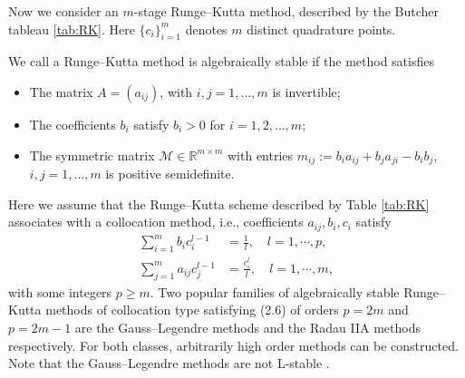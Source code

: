 
Now we consider an $m$-stage Runge--Kutta method, described by the Butcher tableau \ref{tab:RK}. %
Here $\{c_i\}_{i=1}^m$ denotes $m$ distinct quadrature points.
\begin{definition}
We call a Runge--Kutta method is algebraically stable if the method satisfies
\begin{itemize}
\item[{\bf (P5)(a)}] The matrix $A = (a_{ij})$, with $i,j=1,\ldots,m$ is invertible;
\item[{\bf (P5)(b)}] The coefficients $b_i$ satisfy $b_i>0$ for $i=1,2,\dots,m$;
\item[{\bf (P5)(c)}] The  symmetric matrix $\mathcal{M}\in  \mathbb{R}^{m\times m }$
with entries $m_{ij} := b_ia_{ij} + b_ja_{ji} - b_ib_j$, $i, j = 1,\ldots,m$
is positive semidefinite. %
\end{itemize}
\end{definition}

Here we assume that the Runge--Kutta scheme described  by Table \ref{tab:RK}
associates with a collocation method, i.e., coefficients $a_{ij}, b_i, c_i$ satisfy
\begin{align}
        \sum_{i=1}^m b_i c_i^{l-1} &= \frac1l, \quad l = 1, \cdots, p,\label{eqn:accuracy} \\
        \sum_{j=1}^m a_{ij} c_j^{l-1} &= \frac{c_i^l}l, \quad l = 1, \cdots, m,\label{eqn:stage-order}
\end{align}
with some integers $p\ge m$. Two popular families of algebraically stable Runge--Kutta
methods of collocation type satisfying (2.6) of orders $p = 2m$ and $p = 2m - 1$
 are the Gauss--Legendre  methods and the Radau IIA methods respectively. For both classes,
arbitrarily high order methods can be constructed. Note that the Gauss--Legendre methods
are not L-stable \cite{HairerWanner:2010}.

